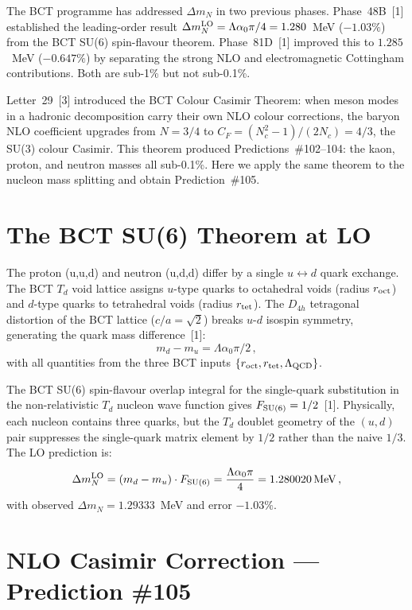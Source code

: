 \documentclass[10pt,twocolumn]{article}
\begin{document}
The BCT programme has addressed $\Delta m_N$ in two previous phases. Phase~48B~[1] established
the leading-order result $\Delta m_N^{\rm LO} = \Lambda\alpha_0\pi/4 = 1.280$~MeV ($-1.03\%$)
from the BCT SU(6) spin-flavour theorem. Phase~81D~[1] improved this to $1.285$~MeV
($-0.647\%$) by separating the strong NLO and electromagnetic Cottingham contributions. Both are
sub-1\% but not sub-0.1\%.

Letter~29~[3] introduced the BCT Colour Casimir Theorem: when meson modes in a hadronic
decomposition carry their own NLO colour corrections, the baryon NLO coefficient upgrades from
$N = 3/4$ to $C_F = (N_c^2-1)/(2N_c) = 4/3$, the SU(3) colour Casimir. This theorem produced
Predictions~\#102--104: the kaon, proton, and neutron masses all sub-0.1\%. Here we apply the
same theorem to the nucleon mass splitting and obtain Prediction~\#105.

\section{The BCT SU(6) Theorem at LO}

The proton (u,u,d) and neutron (u,d,d) differ by a single $u \leftrightarrow d$ quark exchange.
The BCT $T_d$ void lattice assigns $u$-type quarks to octahedral voids (radius $r_{\rm oct}$)
and $d$-type quarks to tetrahedral voids (radius $r_{\rm tet}$). The $D_{4h}$ tetragonal
distortion of the BCT lattice ($c/a = \sqrt{2}$) breaks $u$-$d$ isospin symmetry, generating
the quark mass difference~[1]:
\begin{equation}
m_d - m_u = \Lambda\alpha_0\pi/2\,,
\label{eq:quarkdiff}
\end{equation}
with all quantities from the three BCT inputs $\{r_{\rm oct}, r_{\rm tet}, \Lambda_{\rm QCD}\}$.

The BCT SU(6) spin-flavour overlap integral for the single-quark substitution in the
non-relativistic $T_d$ nucleon wave function gives $F_{\rm SU(6)} = 1/2$~[1]. Physically, each
nucleon contains three quarks, but the $T_d$ doublet geometry of the $(u,d)$ pair suppresses
the single-quark matrix element by $1/2$ rather than the naive $1/3$. The LO prediction is:
\begin{equation}
\Delta m_N^{\rm LO} = (m_d - m_u)\cdot F_{\rm SU(6)}
  = \frac{\Lambda\alpha_0\pi}{4} = 1.280020\,\text{MeV}\,,
\label{eq:DmLO}
\end{equation}
with observed $\Delta m_N = 1.29333$~MeV and error $-1.03\%$.

\section{NLO Casimir Correction --- Prediction \#105}
\end{document}

